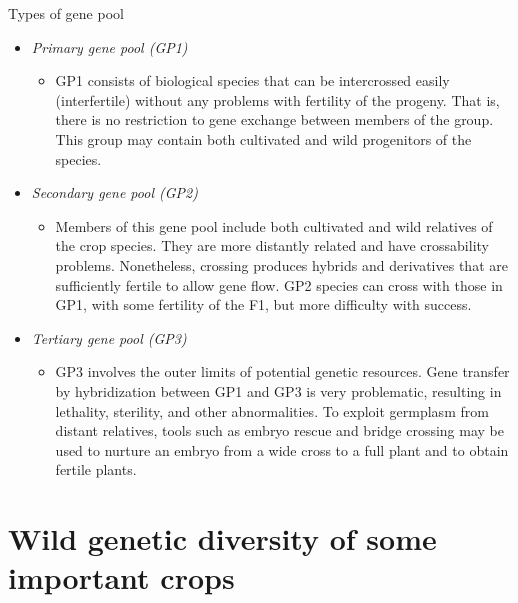 \documentclass[
  ignorenonframetext,
  aspectratio=169]{beamer}
\providecommand{\tightlist}{%
  \setlength{\itemsep}{0pt}\setlength{\parskip}{0pt}}
\begin{document}
\begin{frame}{Types of gene pool}
\protect\hypertarget{types-of-gene-pool}{}
\small

\begin{itemize}
\tightlist
\item
  \emph{Primary gene pool (GP1)}

  \begin{itemize}
  \tightlist
  \item
    GP1 consists of biological species that can be intercrossed easily
    (interfertile) without any problems with fertility of the progeny.
    That is, there is no restriction to gene exchange between members of
    the group. This group may contain both cultivated and wild
    progenitors of the species.
  \end{itemize}
\item
  \emph{Secondary gene pool (GP2)}

  \begin{itemize}
  \tightlist
  \item
    Members of this gene pool include both cultivated and wild relatives
    of the crop species. They are more distantly related and have
    crossability problems. Nonetheless, crossing produces hybrids and
    derivatives that are sufficiently fertile to allow gene flow. GP2
    species can cross with those in GP1, with some fertility of the F1,
    but more difficulty with success.
  \end{itemize}
\item
  \emph{Tertiary gene pool (GP3)}

  \begin{itemize}
  \tightlist
  \item
    GP3 involves the outer limits of potential genetic resources. Gene
    transfer by hybridization between GP1 and GP3 is very problematic,
    resulting in lethality, sterility, and other abnormalities. To
    exploit germplasm from distant relatives, tools such as embryo
    rescue and bridge crossing may be used to nurture an embryo from a
    wide cross to a full plant and to obtain fertile plants.
  \end{itemize}
\end{itemize}
\end{frame}

\hypertarget{wild-genetic-diversity-of-some-important-crops}{%
\section{Wild genetic diversity of some important
crops}\label{wild-genetic-diversity-of-some-important-crops}}
\end{document}
